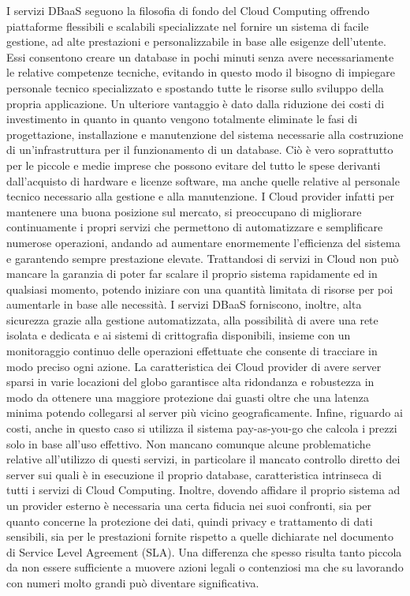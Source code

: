 I servizi DBaaS seguono la filosofia di fondo del Cloud Computing offrendo piattaforme flessibili e scalabili specializzate nel fornire un sistema di facile gestione, ad alte prestazioni e personalizzabile in base alle esigenze dell’utente. Essi consentono creare un database in pochi minuti senza avere necessariamente le relative competenze tecniche, evitando in questo modo il bisogno di impiegare personale tecnico specializzato e spostando tutte le risorse sullo sviluppo della propria applicazione. Un ulteriore vantaggio è dato dalla riduzione dei costi di investimento in quanto in quanto vengono totalmente eliminate le fasi di progettazione, installazione e manutenzione del sistema necessarie alla costruzione di un'infrastruttura per il funzionamento di un database. Ciò è vero soprattutto per le piccole e medie imprese che possono evitare del tutto le spese derivanti dall'acquisto di hardware e licenze software, ma anche quelle relative al personale tecnico necessario alla gestione e alla manutenzione. 
I Cloud provider infatti per mantenere una buona posizione sul mercato, si preoccupano di migliorare continuamente i propri servizi che permettono di automatizzare e semplificare numerose operazioni, andando ad aumentare enormemente l'efficienza del sistema e garantendo sempre prestazione elevate. Trattandosi di servizi in Cloud non può mancare la garanzia di poter far scalare il proprio sistema rapidamente ed in qualsiasi momento, potendo iniziare con una quantità limitata di risorse per poi aumentarle in base alle necessità. I servizi DBaaS forniscono, inoltre, alta sicurezza grazie alla gestione automatizzata, alla possibilità di avere una rete isolata e dedicata e ai sistemi di crittografia disponibili, insieme con un monitoraggio continuo delle operazioni effettuate che consente di tracciare in modo preciso ogni azione. La caratteristica dei Cloud provider di avere server sparsi in varie locazioni del globo garantisce alta ridondanza e robustezza in modo da ottenere una maggiore protezione dai guasti oltre che una latenza minima potendo collegarsi al server più vicino geograficamente. Infine, riguardo ai costi, anche in questo caso si utilizza il sistema pay-as-you-go che calcola i prezzi solo in base all'uso effettivo. Non mancano comunque alcune problematiche relative all'utilizzo di questi servizi, in particolare il mancato controllo diretto dei server sui quali è in esecuzione il proprio database, caratteristica intrinseca di tutti i servizi di Cloud Computing. Inoltre, dovendo affidare il proprio sistema ad un provider esterno è necessaria una certa fiducia nei suoi confronti, sia per quanto concerne la protezione dei dati, quindi privacy e trattamento di dati sensibili, sia per le prestazioni fornite rispetto a quelle dichiarate nel documento di Service Level Agreement (SLA). Una differenza che spesso risulta tanto piccola da non essere sufficiente a muovere azioni legali o contenziosi ma che su lavorando con numeri molto grandi può diventare significativa.\\
